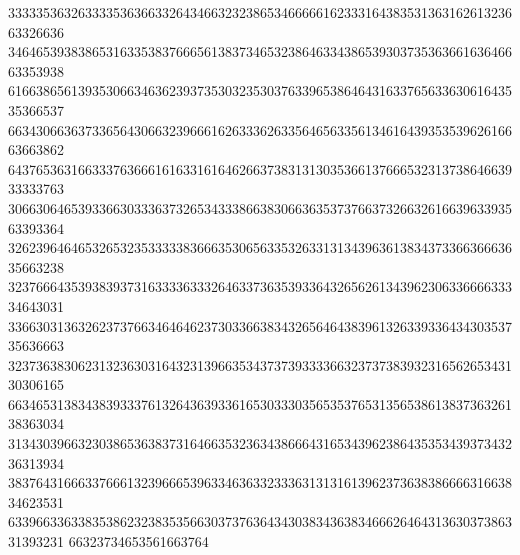 33333536326333353636633264346632323865346666616233316438353136316261323663326636
34646539383865316335383766656138373465323864633438653930373536366163646663353938
61663865613935306634636239373530323530376339653864643163376563363061643535366537
66343066363733656430663239666162633362633564656335613461643935353962616663663862
64376536316633376366616163316164626637383131303536613766653231373864663933333763
30663064653933663033363732653433386638306636353737663732663261663963393563393364
32623964646532653235333338366635306563353263313134396361383437336636663635663238
32376664353938393731633336333264633736353933643265626134396230633666633334643031
33663031363262373766346464623730336638343265646438396132633933643430353735636663
32373638306231323630316432313966353437373933336632373738393231656265343130306165
66346531383438393337613264363933616530333035653537653135653861383736326138363034
31343039663230386536383731646635323634386664316534396238643535343937343236313934
38376431666337666132396665396334636332333631313161396237363838666631663834623531
63396633633835386232383535663037376364343038343638346662646431363037386331393231
66323734653561663764
